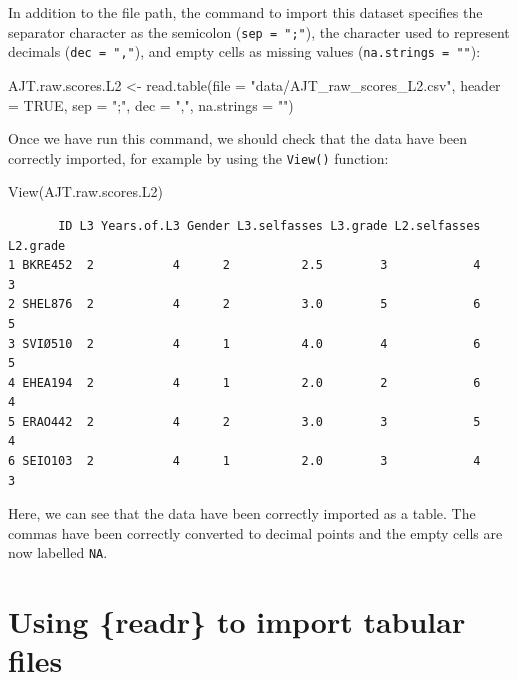 \documentclass[
  letterpaper,
  DIV=11,
  numbers=noendperiod]{scrreprt}
\newenvironment{Shaded}{\begin{snugshade}}{\end{snugshade}}
\newcommand{\AttributeTok}[1]{\textcolor[rgb]{0.40,0.45,0.13}{#1}}
\newcommand{\ConstantTok}[1]{\textcolor[rgb]{0.56,0.35,0.01}{#1}}
\newcommand{\FunctionTok}[1]{\textcolor[rgb]{0.28,0.35,0.67}{#1}}
\newcommand{\NormalTok}[1]{\textcolor[rgb]{0.00,0.23,0.31}{#1}}
\newcommand{\OtherTok}[1]{\textcolor[rgb]{0.00,0.23,0.31}{#1}}
\newcommand{\StringTok}[1]{\textcolor[rgb]{0.13,0.47,0.30}{#1}}
\begin{document}
In addition to the file path, the command to import this dataset
specifies the separator character as the semicolon
(\texttt{sep\ =\ ";"}), the character used to represent decimals
(\texttt{dec\ =\ ","}), and empty cells as missing values
(\texttt{na.strings\ =\ ""}):

\begin{Shaded}
\begin{Highlighting}[]
\NormalTok{AJT.raw.scores.L2 }\OtherTok{\textless{}{-}} \FunctionTok{read.table}\NormalTok{(}\AttributeTok{file =} \StringTok{"data/AJT\_raw\_scores\_L2.csv"}\NormalTok{,}
                          \AttributeTok{header =} \ConstantTok{TRUE}\NormalTok{,}
                          \AttributeTok{sep =} \StringTok{";"}\NormalTok{,}
                          \AttributeTok{dec =} \StringTok{","}\NormalTok{,}
                          \AttributeTok{na.strings =} \StringTok{""}\NormalTok{)}
\end{Highlighting}
\end{Shaded}

Once we have run this command, we should check that the data have been
correctly imported, for example by using the \texttt{View()} function:

\begin{Shaded}
\begin{Highlighting}[]
\FunctionTok{View}\NormalTok{(AJT.raw.scores.L2)}
\end{Highlighting}
\end{Shaded}

\begin{verbatim}
       ID L3 Years.of.L3 Gender L3.selfasses L3.grade L2.selfasses L2.grade
1 BKRE452  2           4      2          2.5        3            4        3
2 SHEL876  2           4      2          3.0        5            6        5
3 SVIØ510  2           4      1          4.0        4            6        5
4 EHEA194  2           4      1          2.0        2            6        4
5 ERAO442  2           4      2          3.0        3            5        4
6 SEIO103  2           4      1          2.0        3            4        3
\end{verbatim}

Here, we can see that the data have been correctly imported as a table.
The commas have been correctly converted to decimal points and the empty
cells are now labelled \texttt{NA}.

\section{Using \{readr\} to import tabular files}\label{sec-readr}
\end{document}
